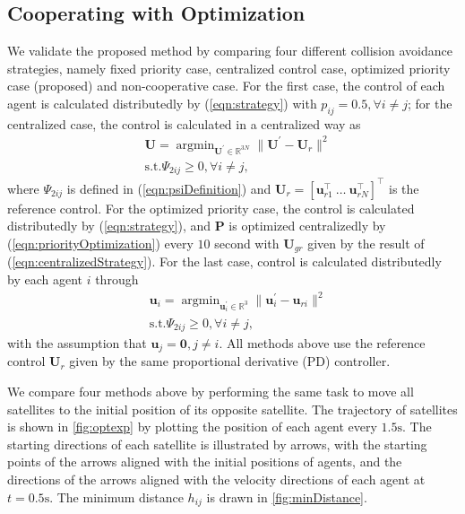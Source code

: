 \documentclass{ifacconf}
\begin{document}
\subsection{Cooperating with Optimization}
\par We validate the proposed method by comparing four different collision avoidance strategies, namely fixed priority case, centralized control case, optimized priority case (proposed) and non-cooperative case.
For the first case, the control of each agent is calculated distributedly by (\ref{eqn:strategy}) with $p_{ij} = 0.5, \forall i \neq j$;
for the centralized case, the control is calculated in a centralized way as 
\begin{equation}\label{eqn:centralizedStrategy}
\begin{aligned}
      &\boldsymbol{U} = \mathop{\arg \min}_{\boldsymbol{U}^{\prime} \in \mathbb{R}^{3 N}} \| \boldsymbol{U}^\prime - \boldsymbol{U}_r\|^2 \\
      &\mathrm{s.t.}  \Psi_{2ij} \ge 0, \forall i \neq j,
\end{aligned}
\end{equation}
where $\Psi_{2ij}$ is defined in (\ref{eqn:psiDefinition}) and $\boldsymbol{U}_r = [\boldsymbol{u}_{r1}^{\top}~\dots~\boldsymbol{u}_{rN}^{\top}]^\top$ is the reference control.
For the optimized priority case, the control is calculated distributedly by (\ref{eqn:strategy}), and $\boldsymbol{P}$ is optimized centralizedly by (\ref{eqn:priorityOptimization}) every $10$ second with $\boldsymbol{U}_{gr}$ given by the result of (\ref{eqn:centralizedStrategy}).
For the last case, control is calculated distributedly by each agent $i$ through
\begin{equation}
\begin{aligned}
      & \boldsymbol{u}_i = \mathop{\arg \min}_{\boldsymbol{u}_i^{\prime} \in \mathbb{R}^{3}} \| \boldsymbol{u}_i^\prime - \boldsymbol{u}_{ri}\|^2 \\
      & \mathrm{s.t.}  \Psi_{2ij} \ge 0, \forall i \neq j,
\end{aligned}
\end{equation}
with the assumption that $\boldsymbol{u}_j = \boldsymbol{0}, j \neq i$.  
All methods above use the reference control $\boldsymbol{U}_r$ given by the same proportional derivative (PD) controller.

\par We compare four methods above by performing the same task to move all satellites to the initial position of its opposite satellite. The trajectory of satellites is shown in {\figurename} \ref{fig:optexp} by plotting the position of each agent every $1.5\mathrm{s}$. The starting directions of each satellite is illustrated by arrows, with the starting points of the arrows aligned with the initial positions of agents, and the directions of the arrows aligned with the velocity directions of each agent at $t = 0.5\mathrm{s}$.
The minimum distance $h_{ij}$ is drawn in {\figurename} \ref{fig:minDistance}.
\end{document}

